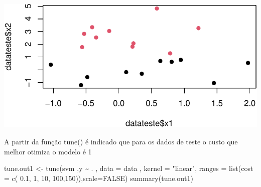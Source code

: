 \documentclass[
  a4paperpaper,
]{article}
\newenvironment{Shaded}{\begin{snugshade}}{\end{snugshade}}
\newcommand{\AttributeTok}[1]{\textcolor[rgb]{0.40,0.45,0.13}{#1}}
\newcommand{\ConstantTok}[1]{\textcolor[rgb]{0.56,0.35,0.01}{#1}}
\newcommand{\DecValTok}[1]{\textcolor[rgb]{0.68,0.00,0.00}{#1}}
\newcommand{\FloatTok}[1]{\textcolor[rgb]{0.68,0.00,0.00}{#1}}
\newcommand{\FunctionTok}[1]{\textcolor[rgb]{0.28,0.35,0.67}{#1}}
\newcommand{\NormalTok}[1]{\textcolor[rgb]{0.00,0.23,0.31}{#1}}
\newcommand{\OtherTok}[1]{\textcolor[rgb]{0.00,0.23,0.31}{#1}}
\newcommand{\SpecialCharTok}[1]{\textcolor[rgb]{0.37,0.37,0.37}{#1}}
\newcommand{\StringTok}[1]{\textcolor[rgb]{0.13,0.47,0.30}{#1}}
\begin{document}
\begin{Shaded}
\end{Shaded}

\includegraphics{lista-5_files/figure-pdf/unnamed-chunk-25-1.pdf}

A partir da função tune() é indicado que para os dados de teste o custo
que melhor otimiza o modelo é 1

\begin{Shaded}
\begin{Highlighting}[]
\NormalTok{tune.out1 }\OtherTok{\textless{}{-}} \FunctionTok{tune}\NormalTok{(svm ,y }\SpecialCharTok{\textasciitilde{}}\NormalTok{ . , }\AttributeTok{data =}\NormalTok{ data , }\AttributeTok{kernel =} \StringTok{"linear"}\NormalTok{,}
                 \AttributeTok{ranges =} \FunctionTok{list}\NormalTok{(}\AttributeTok{cost =} \FunctionTok{c}\NormalTok{( }\FloatTok{0.1}\NormalTok{, }\DecValTok{1}\NormalTok{, }\DecValTok{10}\NormalTok{, }\DecValTok{100}\NormalTok{,}\DecValTok{150}\NormalTok{)),}\AttributeTok{scale=}\ConstantTok{FALSE}\NormalTok{)}
\FunctionTok{summary}\NormalTok{(tune.out1)}
\end{Highlighting}
\end{Shaded}
\end{document}
